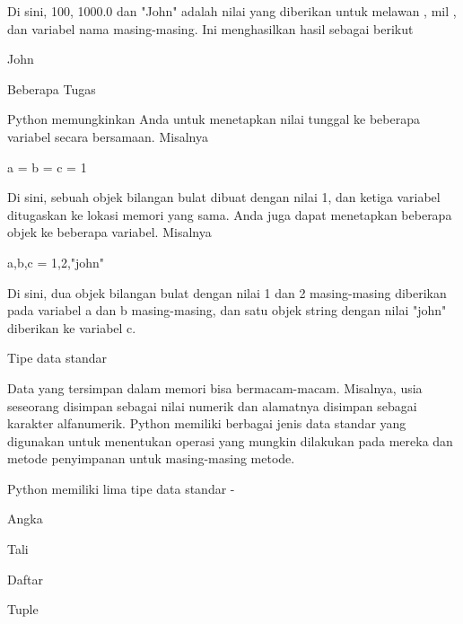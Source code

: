 Di sini, 100, 1000.0 dan "John" adalah nilai yang diberikan untuk $  $melawan $  $, $  $mil $  $, dan $  $variabel $  $nama $  $masing-masing. $  $Ini menghasilkan hasil sebagai berikut  \par
\vspace{12pt}
 \par
{} \par
\noindent 
John \par
\vspace{12pt}
\noindent 
Beberapa Tugas \par
\noindent 
Python memungkinkan Anda untuk menetapkan nilai tunggal ke beberapa variabel secara bersamaan. $  $Misalnya  \par
\vspace{12pt}
\noindent 
a = b = c = 1 \par
\vspace{12pt}
\noindent 
Di sini, sebuah objek bilangan bulat dibuat dengan nilai 1, dan ketiga variabel ditugaskan ke lokasi memori yang sama. $  $Anda juga dapat menetapkan beberapa objek ke beberapa variabel. $  $Misalnya  \par
\vspace{12pt}
\noindent 
a,b,c = 1,2,"john" \par
\vspace{12pt}
\noindent 
Di sini, dua objek bilangan bulat dengan nilai 1 dan 2 masing-masing diberikan pada variabel a dan b masing-masing, dan satu objek string dengan nilai "john" diberikan ke variabel c. \par
\vspace{12pt}
\noindent 
Tipe data standar \par
\vspace{12pt}
\noindent 
Data yang tersimpan dalam memori bisa bermacam-macam. $  $Misalnya, usia seseorang disimpan sebagai nilai numerik dan alamatnya disimpan sebagai karakter alfanumerik. $  $Python memiliki berbagai jenis data standar yang digunakan untuk menentukan operasi yang mungkin dilakukan pada mereka dan metode penyimpanan untuk masing-masing metode. \par
\vspace{12pt}
\noindent 
Python memiliki lima tipe data standar - \par
\vspace{12pt}
\noindent 
Angka \par
\noindent 
Tali \par
\noindent 
Daftar \par
\noindent 
Tuple \par
